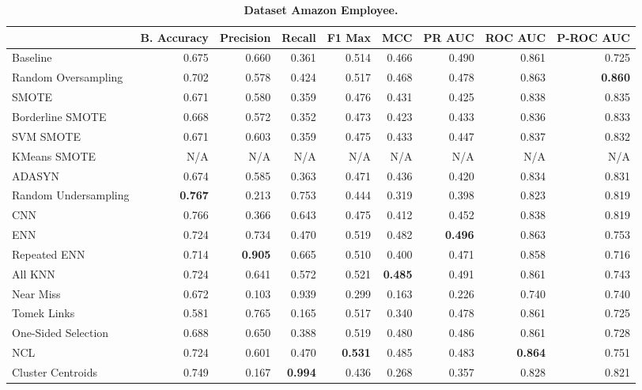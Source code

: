 \begin{table}[H]
    \centering
    \setlength\tabcolsep{2pt}
    \begin{tabularx}{\textwidth}{lRRRRRRRR}
        & B. Accuracy & Precision & Recall & F1 Max & MCC & PR AUC & ROC AUC & P-ROC AUC \\
        \midrule
        Baseline & 0.675 & 0.660 & 0.361 & 0.514 & 0.466 & 0.490 & 0.861 & 0.725 \\
        Random Oversampling & 0.702 & 0.578 & 0.424 & 0.517 & 0.468 & 0.478 & 0.863 & \textbf{0.860} \\
        SMOTE & 0.671 & 0.580 & 0.359 & 0.476 & 0.431 & 0.425 & 0.838 & 0.835 \\
        Borderline SMOTE & 0.668 & 0.572 & 0.352 & 0.473 & 0.423 & 0.433 & 0.836 & 0.833 \\
        SVM SMOTE & 0.671 & 0.603 & 0.359 & 0.475 & 0.433 & 0.447 & 0.837 & 0.832 \\
        KMeans SMOTE & N/A & N/A & N/A & N/A & N/A & N/A & N/A & N/A \\
        ADASYN & 0.674 & 0.585 & 0.363 & 0.471 & 0.436 & 0.420 & 0.834 & 0.831 \\
        Random Undersampling & \textbf{0.767} & 0.213 & 0.753 & 0.444 & 0.319 & 0.398 & 0.823 & 0.819 \\
        CNN & 0.766 & 0.366 & 0.643 & 0.475 & 0.412 & 0.452 & 0.838 & 0.819 \\
        ENN & 0.724 & 0.734 & 0.470 & 0.519 & 0.482 & \textbf{0.496} & 0.863 & 0.753 \\
        Repeated ENN & 0.714 & \textbf{0.905} & 0.665 & 0.510 & 0.400 & 0.471 & 0.858 & 0.716 \\
        All KNN & 0.724 & 0.641 & 0.572 & 0.521 & \textbf{0.485} & 0.491 & 0.861 & 0.743 \\
        Near Miss & 0.672 & 0.103 & 0.939 & 0.299 & 0.163 & 0.226 & 0.740 & 0.740 \\
        Tomek Links & 0.581 & 0.765 & 0.165 & 0.517 & 0.340 & 0.478 & 0.861 & 0.725 \\
        One-Sided Selection & 0.688 & 0.650 & 0.388 & 0.519 & 0.480 & 0.486 & 0.861 & 0.728 \\
        NCL & 0.724 & 0.601 & 0.470 & \textbf{0.531} & 0.485 & 0.483 & \textbf{0.864} & 0.751 \\
        Cluster Centroids & 0.749 & 0.167 & \textbf{0.994} & 0.436 & 0.268 & 0.357 & 0.828 & 0.821 \\
    \end{tabularx}
    \vspace{1mm}
    \caption{\textbf{Dataset Amazon Employee.}}
\end{table}
